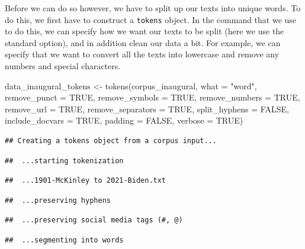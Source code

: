 \documentclass[
]{book}
\newenvironment{Shaded}{\begin{snugshade}}{\end{snugshade}}
\newcommand{\AttributeTok}[1]{\textcolor[rgb]{0.77,0.63,0.00}{#1}}
\newcommand{\ConstantTok}[1]{\textcolor[rgb]{0.00,0.00,0.00}{#1}}
\newcommand{\FunctionTok}[1]{\textcolor[rgb]{0.00,0.00,0.00}{#1}}
\newcommand{\NormalTok}[1]{#1}
\newcommand{\OtherTok}[1]{\textcolor[rgb]{0.56,0.35,0.01}{#1}}
\newcommand{\StringTok}[1]{\textcolor[rgb]{0.31,0.60,0.02}{#1}}
\begin{document}
Before we can do so however, we have to split up our texts into unique words. To do this, we first have to construct a \texttt{tokens} object. In the command that we use to do this, we can specify how we want our texts to be split (here we use the standard option), and in addition clean our data a bit. For example, we can specify that we want to convert all the texts into lowercase and remove any numbers and special characters.

\begin{Shaded}
\begin{Highlighting}[]
\NormalTok{data\_inaugural\_tokens }\OtherTok{\textless{}{-}} \FunctionTok{tokens}\NormalTok{(corpus\_inaugural, }\AttributeTok{what =} \StringTok{"word"}\NormalTok{,}
    \AttributeTok{remove\_punct =} \ConstantTok{TRUE}\NormalTok{, }\AttributeTok{remove\_symbols =} \ConstantTok{TRUE}\NormalTok{, }\AttributeTok{remove\_numbers =} \ConstantTok{TRUE}\NormalTok{,}
    \AttributeTok{remove\_url =} \ConstantTok{TRUE}\NormalTok{, }\AttributeTok{remove\_separators =} \ConstantTok{TRUE}\NormalTok{, }\AttributeTok{split\_hyphens =} \ConstantTok{FALSE}\NormalTok{,}
    \AttributeTok{include\_docvars =} \ConstantTok{TRUE}\NormalTok{, }\AttributeTok{padding =} \ConstantTok{FALSE}\NormalTok{, }\AttributeTok{verbose =} \ConstantTok{TRUE}\NormalTok{)}
\end{Highlighting}
\end{Shaded}

\begin{verbatim}
## Creating a tokens object from a corpus input...
\end{verbatim}

\begin{verbatim}
##  ...starting tokenization
\end{verbatim}

\begin{verbatim}
##  ...1901-McKinley to 2021-Biden.txt
\end{verbatim}

\begin{verbatim}
##  ...preserving hyphens
\end{verbatim}

\begin{verbatim}
##  ...preserving social media tags (#, @)
\end{verbatim}

\begin{verbatim}
##  ...segmenting into words
\end{verbatim}
\end{document}
